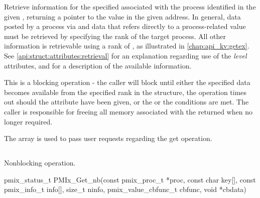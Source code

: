 \descr

Retrieve information for the specified  associated with the process identified in the given , returning a pointer to the value in the given address. In general, data posted by a process via  and data that refers directly to a process-related value must be retrieved by specifying the rank of the target process. All other information is retrievable using a rank of , as illustrated in \ref{chap:api_kv:getex}. See \ref{api:struct:attributes:retrieval} for an explanation regarding use of the \emph{level} attributes, and  for a description of the available information.

This is a blocking operation - the caller will block until either the specified data becomes available from the specified rank in the  structure, the operation times out should the  attribute have been given, or the  or the  conditions are met. The caller is responsible for freeing all memory associated with the returned  when no longer required.

The  array is used to pass user requests regarding the get operation.

\subsection{}

\summary

Nonblocking  operation.

\format

\cspecificstart
\begin{codepar}
pmix_status_t
PMIx_Get_nb(const pmix_proc_t *proc, const char key[],
            const pmix_info_t info[], size_t ninfo,
            pmix_value_cbfunc_t cbfunc, void *cbdata)
\end{codepar}
\cspecificend

\begin{arglist}
\end{arglist}

